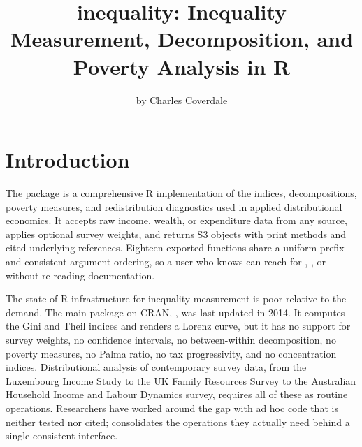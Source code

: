 \title{inequality: Inequality Measurement, Decomposition, and Poverty Analysis in R}


\author{by Charles Coverdale}

\maketitle


\section{Introduction}\label{introduction}

The  package is a comprehensive R implementation of
the indices, decompositions, poverty measures, and redistribution
diagnostics used in applied distributional economics. It accepts raw
income, wealth, or expenditure data from any source, applies optional
survey weights, and returns S3 objects with print methods and cited
underlying references. Eighteen exported functions share a uniform
 prefix and consistent argument ordering, so a user who
knows  can reach for ,
, or  without re-reading
documentation.

The state of R infrastructure for inequality measurement is poor
relative to the demand. The main package on CRAN, , was
last updated in 2014. It computes the Gini and Theil indices and
renders a Lorenz curve, but it has no support for survey weights,
no confidence intervals, no between-within decomposition, no poverty
measures, no Palma ratio, no tax progressivity, and no concentration
indices. Distributional analysis of contemporary survey data, from the
Luxembourg Income Study to the UK Family Resources Survey to the
Australian Household Income and Labour Dynamics survey, requires all
of these as routine operations. Researchers have worked around the
gap with ad hoc code that is neither tested nor cited;
 consolidates the operations they actually need
behind a single consistent interface.

